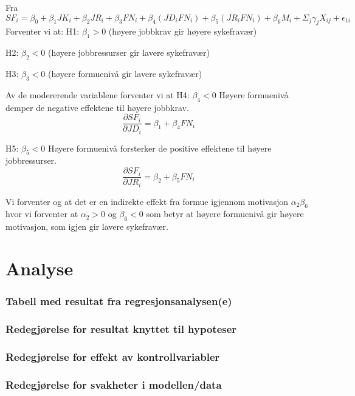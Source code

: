 \documentclass[
  12pt,
  a4paper,
  DIV=11,
  numbers=noendperiod]{scrartcl}
\begin{document}
Fra \[
SF_i = \beta_0 + \beta_1 JK_i + \beta_2 JR_i + \beta_3 FN_i + \beta_4 (JD_i FN_i) + \beta_5 (JR_i FN_i) + \beta_6 M_i + \Sigma_j \gamma_{j}X_{ij} + \epsilon_{1i}
\] Forventer vi at: H1: \(\beta_1 > 0\) (høyere jobbkrav gir høyere
sykefravær)

H2: \(\beta_2 < 0\) (høyere jobbressurser gir lavere sykefravær)

H3: \(\beta_3 < 0\) (høyere formuenivå gir lavere sykefravær)

Av de modererende variablene forventer vi at H4: \(\beta_4 < 0\) Høyere
formuenivå demper de negative effektene til høyere jobbkrav. \[
\frac{\partial SF_i}{\partial JD_i} = \beta_1 + \beta_4 FN_i
\]

H5: \(\beta_5 < 0\) Høyere formuenivå forsterker de positive effektene
til høyere jobbressurser. \[
\frac{\partial SF_i}{\partial JR_i} = \beta_2 + \beta_5 FN_i
\]

Vi forventer og at det er en indirekte effekt fra formue igjennom
motivasjon \(\alpha_2 \beta_6\) hvor vi forventer at \(\alpha_2 > 0\) og
\(\beta_6 < 0\) som betyr at høyere formuenivå gir høyere motivasjon,
som igjen gir lavere sykefravær.

\newpage

\section{Analyse}\label{analyse}

\subsubsection{Tabell med resultat fra
regresjonsanalysen(e)}\label{tabell-med-resultat-fra-regresjonsanalysene}

\subsubsection{Redegjørelse for resultat knyttet til
hypoteser}\label{redegjuxf8relse-for-resultat-knyttet-til-hypoteser}

\subsubsection{Redegjørelse for effekt av
kontrollvariabler}\label{redegjuxf8relse-for-effekt-av-kontrollvariabler}

\subsubsection{Redegjørelse for svakheter i
modellen/data}\label{redegjuxf8relse-for-svakheter-i-modellendata}
\end{document}
